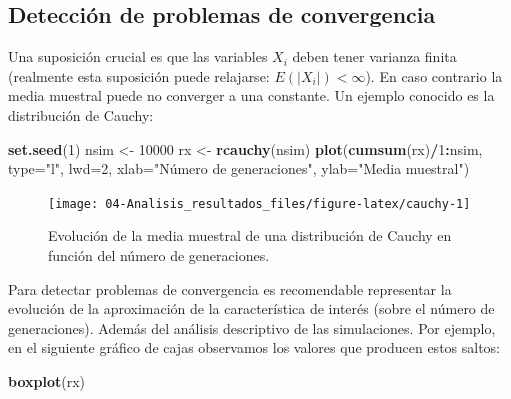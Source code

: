\documentclass[]{book}
\newenvironment{Shaded}{\begin{snugshade}}{\end{snugshade}}
\newcommand{\KeywordTok}[1]{\textcolor[rgb]{0.13,0.29,0.53}{\textbf{#1}}}
\newcommand{\DataTypeTok}[1]{\textcolor[rgb]{0.13,0.29,0.53}{#1}}
\newcommand{\DecValTok}[1]{\textcolor[rgb]{0.00,0.00,0.81}{#1}}
\newcommand{\StringTok}[1]{\textcolor[rgb]{0.31,0.60,0.02}{#1}}
\newcommand{\OperatorTok}[1]{\textcolor[rgb]{0.81,0.36,0.00}{\textbf{#1}}}
\newcommand{\NormalTok}[1]{#1}
\theoremstyle{definition}
\theoremstyle{definition}
\theoremstyle{definition}
\theoremstyle{remark}
\begin{document}
\subsection{Detección de problemas de
convergencia}\label{deteccion-de-problemas-de-convergencia}

Una suposición crucial es que las variables \(X_{i}\) deben tener
varianza finita (realmente esta suposición puede relajarse:
\(E\left( \left\vert X_{i} \right\vert \right) < \infty\)). En caso
contrario la media muestral puede no converger a una constante. Un
ejemplo conocido es la distribución de Cauchy:

\begin{Shaded}
\begin{Highlighting}[]
\KeywordTok{set.seed}\NormalTok{(}\DecValTok{1}\NormalTok{)}
\NormalTok{nsim <-}\StringTok{ }\DecValTok{10000}
\NormalTok{rx <-}\StringTok{ }\KeywordTok{rcauchy}\NormalTok{(nsim)}
\KeywordTok{plot}\NormalTok{(}\KeywordTok{cumsum}\NormalTok{(rx)}\OperatorTok{/}\DecValTok{1}\OperatorTok{:}\NormalTok{nsim, }\DataTypeTok{type=}\StringTok{"l"}\NormalTok{, }\DataTypeTok{lwd=}\DecValTok{2}\NormalTok{, }
     \DataTypeTok{xlab=}\StringTok{"Número de generaciones"}\NormalTok{, }\DataTypeTok{ylab=}\StringTok{"Media muestral"}\NormalTok{)}
\end{Highlighting}
\end{Shaded}

\begin{figure}[!htb]

{\centering \texttt{[image: 04-Analisis\_resultados\_files/figure-latex/cauchy-1]} 

}

\caption{Evolución de la media muestral de una distribución de Cauchy en función del número de generaciones.}\label{fig:cauchy}
\end{figure}

Para detectar problemas de convergencia es recomendable representar la
evolución de la aproximación de la característica de interés (sobre el
número de generaciones). Además del análisis descriptivo de las
simulaciones. Por ejemplo, en el siguiente gráfico de cajas observamos
los valores que producen estos saltos:

\begin{Shaded}
\begin{Highlighting}[]
\KeywordTok{boxplot}\NormalTok{(rx)}
\end{Highlighting}
\end{Shaded}
\end{document}
